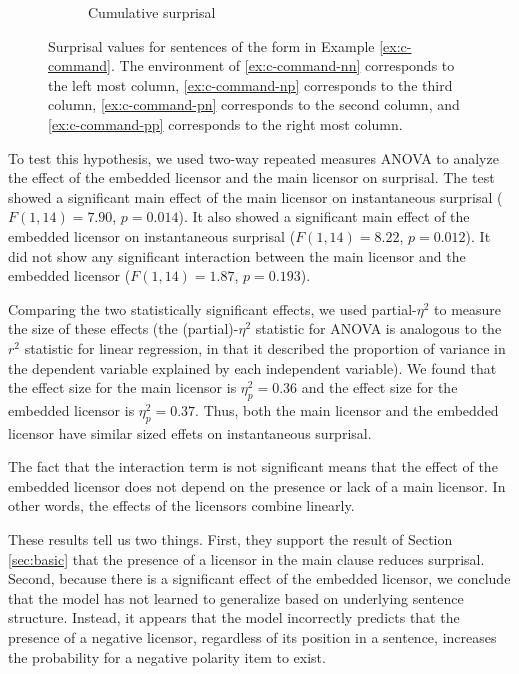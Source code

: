 \documentclass[11pt, round]{article}
\begin{document}
\begin{figure}
\begin{subfigure}[b]{0.5\textwidth}
        \caption{Cumulative surprisal}
    \end{subfigure}
    \caption{Surprisal values for sentences of the form in Example \ref{ex:c-command}. The environment of \ref{ex:c-command-nn} corresponds to the left most column, \ref{ex:c-command-np} corresponds to the third column, \ref{ex:c-command-pn} corresponds to the second column, and \ref{ex:c-command-pp} corresponds to the right most column.}
    \label{fig:c-command-box-plots}
\end{figure}


To test this hypothesis, we used two-way repeated measures ANOVA to analyze the effect of the embedded licensor and the main licensor on surprisal. The test showed a significant main effect of the main licensor on instantaneous surprisal ($F(1, 14) = 7.90$, $p = 0.014$). It also showed a significant main effect of the embedded licensor on instantaneous surprisal ($F(1, 14) = 8.22$, $p = 0.012$). It did not show any significant interaction between the main licensor and the embedded licensor ($F(1, 14) = 1.87$, $p = 0.193$).

Comparing the two statistically significant effects, we used partial-$\eta^2$ to measure the size of these effects (the (partial)-$\eta^2$ statistic for ANOVA is analogous to the $r^2$ statistic for linear regression, in that it described the proportion of variance in the dependent variable explained by each independent variable). We found that the effect size for the main licensor is $\eta_p^2 = 0.36$ and the effect size for the embedded licensor is $\eta_p^2 = 0.37$. Thus, both the main licensor and the embedded licensor have similar sized effets on instantaneous surprisal.

The fact that the interaction term is not significant means that the effect of the embedded licensor does not depend on the presence or lack of a main licensor. In other words, the effects of the licensors combine linearly.

These results tell us two things. First, they support the result of Section \ref{sec:basic} that the presence of a licensor in the main clause reduces surprisal. Second, because there is a significant effect of the embedded licensor, we conclude that the model has not learned to generalize based on underlying sentence structure. Instead, it appears that the model incorrectly predicts that the presence of a negative licensor, regardless of its position in a sentence, increases the probability for a negative polarity item to exist.
\end{document}
